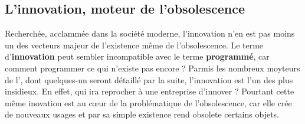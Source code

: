 \subsection{L'innovation, moteur de l'obsolescence}
Recherchée, acclammée dans la société moderne, l'innovation n'en est pas moins un des vecteurs majeur de l'existence même de l'obsolescence. Le terme d'\textbf{innovation} peut sembler incompatible avec le terme \textbf{programmé}, car comment programmer ce qui n'existe pas encore ?
\smallbreak
Parmis les nombreux moyteurs de l'\op, dont quelques-un seront détaillé par la suite, l'innovation est l'un des plus insidieux. En effet, qui ira reprocher à une entreprise d'innover ? Pourtant cette même inovation est au cœur de la problématique de l'obsolescence, car elle crée de nouveaux usages et par sa simple existence rend obsolete certains objets.
